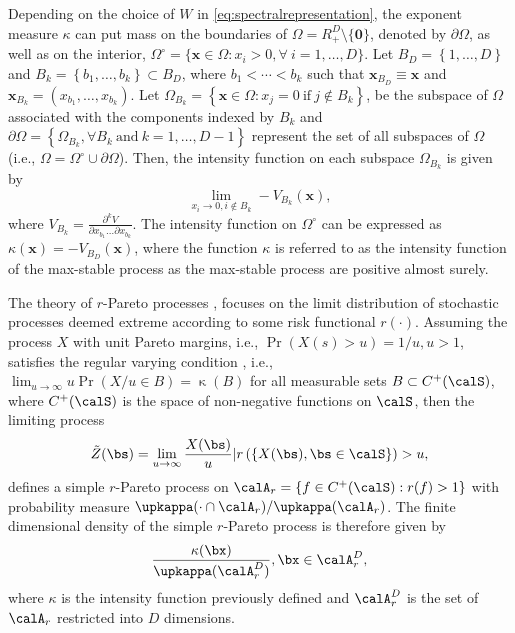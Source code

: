 \documentclass[12pt]{article}
\begin{document}
Depending on the choice of $W$ in \eqref{eq:spectralrepresentation}, the exponent measure $\kappa$ can put mass on the boundaries of $\Omega = R^{D}_+ \setminus \{\bm 0\}$, denoted by $\partial\Omega$, as well as on the interior, $\Omega^\circ = \{\bm x\in \Omega: x_i>0,\forall\ i=1,\dots,D\}$. Let $B_D = \left\{ 1, \ldots, D \right\}$ and $B_k = \left\{ b_1, \ldots, b_k\right\} \subset B_D$, where $b_1 < \cdots < b_k$ such that $\bm x_{B_D} \equiv \bm x$ and $\bm x_{B_k} = \left( x_{b_1}, \ldots, x_{b_k}\right)$. Let $\Omega_{B_k} = \left\{ \bm x \in \Omega: x_j=0\ \text{if}\  j \notin B_k \right\}$, be the subspace of $\Omega$ associated with the components indexed by $B_k$ and $\partial\Omega = \left\{ \Omega_{B_k}, \forall B_k \ \text{and}\ k=1, \ldots, D-1 \right\}$ represent the set of all subspaces of $\Omega$ (i.e., $\Omega = \Omega^\circ \cup \partial\Omega$). Then, the intensity function on each subspace $\Omega_{B_k}$ is given by 
\begin{equation}
    \label{eq:angular_density}
        \lim_{x_i\to 0, i\notin B_k} - V_{B_k}(\bm x),
\end{equation}
where $V_{B_k} = \frac{\partial^k V}{\partial x_{b_1}\dots\partial x_{b_k}}$. The intensity function on $\Omega^\circ$ can be expressed as 
$\kappa(\bm x)= - V_{B_D}(\bm x)$,
where the function $\kappa$ is referred to as the intensity function of the max-stable process as the max-stable process are positive almost surely.


The theory of $r$-Pareto processes \citep{Dombry.Ribatet:2015, deFondeville.Davison:2022}, focuses on the limit distribution of stochastic processes deemed extreme according to some risk functional $r(\cdot)$.
Assuming the process $X$ with unit Pareto margins, i.e., $\Pr(X(s)>u)=1/u,u>1$, satisfies the regular varying condition \citep[see][]{Dombry.Ribatet:2015}, i.e., $\lim_{u\to\infty}u\Pr(X/u \in B)=\upkappa(B)$ for all measurable sets $B\subset C^+(\calS)$, where $C^+(\calS)$ is the space of non-negative functions on $\calS$, then the limiting process
%
\begin{align}
\label{eq:rpp}    
\tilde{Z}(\bs) = \lim_{u\rightarrow \infty} \frac{X(\bs)}{u}  \vert r\left(\{X(\bs),\bs\in\calS\} \right) >u,
\end{align}
%
defines a simple $r$-Pareto process on $\calA_r = \left\{ f \in C^+(\calS): r(f) > 1\right\}$ with probability measure $\upkappa(\cdot \cap \calA_r)/ \upkappa(\calA_r)$. The finite dimensional density of the simple $r$-Pareto process is therefore given by
%
\begin{align}
\label{eq:rpp_pdf}
\frac{\kappa(\bx)}{\upkappa(\calA_r^D)}, \bx \in \calA_r^D,
\end{align}
%
where $\kappa$ is the intensity function previously defined and $\calA_r^D$ is the set of $\calA_r$ restricted into $D$ dimensions. 
\end{document}
